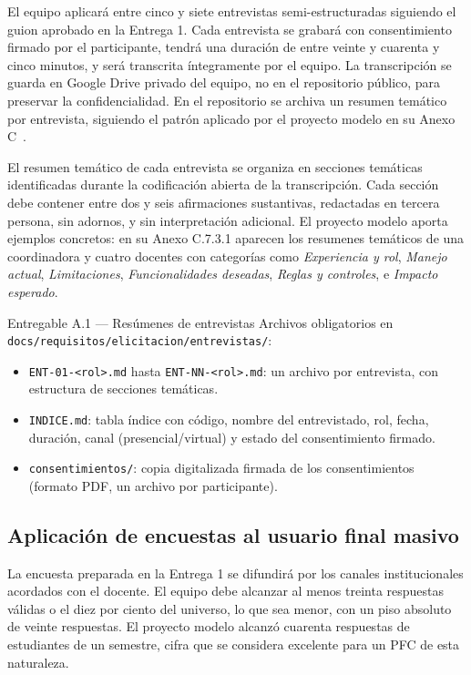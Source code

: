 \documentclass[11pt,a4paper]{article}
\begin{document}
El equipo aplicar\'a entre cinco y siete entrevistas semi-estructuradas siguiendo el guion aprobado en la Entrega 1. Cada entrevista se grabar\'a con consentimiento firmado por el participante, tendr\'a una duraci\'on de entre veinte y cuarenta y cinco minutos, y ser\'a transcrita \'integramente por el equipo. La transcripci\'on se guarda en Google Drive privado del equipo, no en el repositorio p\'ublico, para preservar la confidencialidad. En el repositorio se archiva un resumen tem\'atico por entrevista, siguiendo el patr\'on aplicado por el proyecto modelo en su Anexo C~\cite{hove2005interviews}.

El resumen tem\'atico de cada entrevista se organiza en secciones tem\'aticas identificadas durante la codificaci\'on abierta de la transcripci\'on. Cada secci\'on debe contener entre dos y seis afirmaciones sustantivas, redactadas en tercera persona, sin adornos, y sin interpretaci\'on adicional. El proyecto modelo aporta ejemplos concretos: en su Anexo C.7.3.1 aparecen los resumenes tem\'aticos de una coordinadora y cuatro docentes con categor\'ias como \emph{Experiencia y rol}, \emph{Manejo actual}, \emph{Limitaciones}, \emph{Funcionalidades deseadas}, \emph{Reglas y controles}, e \emph{Impacto esperado}.

\begin{cajaentregable}{Entregable A.1 --- Res\'umenes de entrevistas}
Archivos obligatorios en \texttt{docs/requisitos/elicitacion/entrevistas/}:
\begin{itemize}
    \item \texttt{ENT-01-<rol>.md} hasta \texttt{ENT-NN-<rol>.md}: un archivo por entrevista, con estructura de secciones tem\'aticas.
    \item \texttt{INDICE.md}: tabla \'indice con c\'odigo, nombre del entrevistado, rol, fecha, duraci\'on, canal (presencial/virtual) y estado del consentimiento firmado.
    \item \texttt{consentimientos/}: copia digitalizada firmada de los consentimientos (formato PDF, un archivo por participante).
\end{itemize}
\end{cajaentregable}

\subsection{Aplicaci\'on de encuestas al usuario final masivo}

La encuesta preparada en la Entrega 1 se difundir\'a por los canales institucionales acordados con el docente. El equipo debe alcanzar al menos treinta respuestas v\'alidas o el diez por ciento del universo, lo que sea menor, con un piso absoluto de veinte respuestas. El proyecto modelo alcanz\'o cuarenta respuestas de estudiantes de un semestre, cifra que se considera excelente para un PFC de esta naturaleza.
\end{document}
